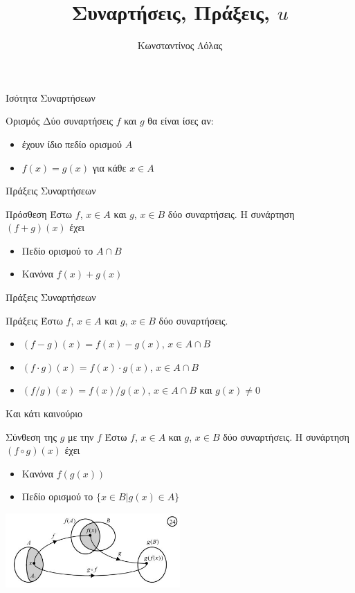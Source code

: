 \documentclass[greek]{beamer}
\title{Συναρτήσεις, Πράξεις, $u$}
\author[Λόλας]{Κωνσταντίνος Λόλας}
\date{}
\begin{document}
\begin{frame}
 \titlepage
\end{frame}
\begin{frame}{Ισότητα Συναρτήσεων}
 \begin{block}{Ορισμός}
  Δύο συναρτήσεις $f$ και $g$ θα είναι ίσες αν:
  \begin{itemize}
   \item έχουν ίδιο πεδίο ορισμού $Α$
   \item $f(x)=g(x)$ για κάθε $x\in Α$
  \end{itemize}
 \end{block}
\end{frame}

\begin{frame}{Πράξεις Συναρτήσεων}
 \begin{block}{Πρόσθεση}
  Έστω $f$, $x\in Α$ και $g$, $x\in Β$ δύο συναρτήσεις. Η συνάρτηση $(f+g)(x)$ έχει
  \begin{itemize}
   \item Πεδίο ορισμού το $A\cap Β$
   \item Κανόνα $f(x)+g(x)$
  \end{itemize}
 \end{block}
\end{frame}

\begin{frame}{Πράξεις Συναρτήσεων}
 \begin{block}{Πράξεις}
  Έστω $f$, $x\in Α$ και $g$, $x\in Β$ δύο συναρτήσεις.
  \begin{itemize}
   \item $(f-g)(x)=f(x)-g(x)$, $x\in A\cap Β$
   \item $(f\cdot g)(x)=f(x)\cdot g(x)$, $x\in A\cap Β$
   \item $(f/g)(x)=f(x)/g(x)$, $x\in A\cap Β$ και $g(x)\ne 0$
  \end{itemize}
 \end{block}
\end{frame}

\begin{frame}{Και κάτι καινούριο}
 \begin{block}{Σύνθεση της $g$ με την $f$}
  Έστω $f$, $x\in Α$ και $g$, $x\in Β$ δύο συναρτήσεις. Η συνάρτηση $(f\circ g)(x)$ έχει
  \begin{itemize}
   \item Κανόνα $f(g(x))$
   \item Πεδίο ορισμού το $\{x\in Β | g(x)\in Α \}$
  \end{itemize}
 \end{block}
 \centering
 \includegraphics[width=0.5\textwidth]{"images/1.2 Σύνθεση.png"}
\end{frame}
\end{document}
